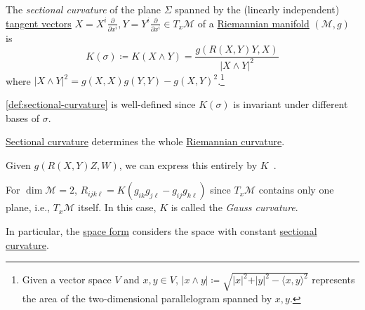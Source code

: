 \begin{definition}\label{def:sectional-curvature}
	The \emph{sectional curvature} of the plane \(\Sigma \) spanned by the (linearly independent) \hyperref[def:tangent-vector]{tangent vectors} \(X = X^i \frac{\partial }{\partial x^i} , Y= Y^i \frac{\partial }{\partial x^i} \in T_x \mathcal{M} \) of a \hyperref[def:Riemannian-manifold]{Riemannian manifold} \((\mathcal{M}, g)\) is
	\[
		K(\sigma ) \coloneqq K(X \wedge Y) = \frac{g(R(X, Y) Y, X)}{\vert X\wedge Y \vert^2 }
	\]
	where \(\vert X \wedge Y \vert ^2 = g(X, X) g(Y, Y) - g(X, Y)^2\).\footnote{Given a vector space \(V\) and \(x, y\in V\), \(\vert x \wedge y \vert \coloneqq \sqrt{\vert x \vert ^2 + \vert y \vert ^{2} - \langle x, y \rangle ^2} \) represents the area of the two-dimensional parallelogram spanned by \(x, y\).}
\end{definition}

\begin{note}
	\autoref{def:sectional-curvature} is well-defined since \(K(\sigma )\) is invariant under different bases of \(\sigma \).
\end{note}

\begin{remark}
	\hyperref[def:sectional-curvature]{Sectional curvature} determines the whole \hyperref[def:Riemannian-curvature]{Riemannian curvature}.
\end{remark}
\begin{explanation}
	Given \(g(R(X, Y)Z, W)\), we can express this entirely by \(K\)~\cite[Lemma 3.3]{flaherty2013riemannian}.
\end{explanation}

\begin{remark}\label{rmk:Gauss-curvature}
	For \(\dim \mathcal{M} = 2\), \(R_{ijk\ell} = K(g_{ik} g_{j \ell } - g_{ij} g_{k \ell })\) since \(T_x \mathcal{M} \) contains only one plane, i.e., \(T_x \mathcal{M} \) itself. In this case, \(K\) is called the \emph{Gauss curvature}.
\end{remark}

In particular, the \hyperref[def:space-form]{space form} considers the space with constant \hyperref[def:sectional-curvature]{sectional curvature}.

